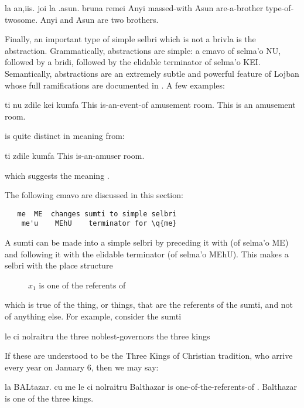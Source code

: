 \begin{example}
la an,iis. joi la .asun. bruna remei\n
Anyi massed-with Asun are-a-brother type-of-twosome.\n
Anyi and Asun are two brothers.
\end{example}

Finally, an important type of simple selbri which is not a
    brivla is the abstraction. Grammatically, abstractions are
    simple: a cmavo of selma'o NU, followed by a bridi, followed by
    the elidable terminator  of selma'o KEI. Semantically,
    abstractions are an extremely subtle and powerful feature of
    Lojban whose full ramifications are documented in . A few examples:
\begin{example}
ti nu zdile kei kumfa\n
This is-an-event-of amusement room.\n
This is an amusement room.
\end{example}

 is quite distinct in meaning
    from:
\begin{example}
ti zdile kumfa\n
This is-an-amuser room.
\end{example}

{\noindent}which suggests the meaning .



The following cmavo are discussed in this section:
\begin{verbatim}
   me  ME  changes sumti to simple selbri
    me'u    MEhU    terminator for \q{me}
\end{verbatim}
    A sumti can be made into a simple selbri by preceding it with
     (of selma'o ME) and following it with the elidable
    terminator  (of selma'o MEhU). This makes a selbri with
    the place structure 
\begin{description}
\item[] $x_1$ is one of the referents of 
\end{description}

which is true of the thing, or things, that are the referents
    of the sumti, and not of anything else. For example, consider
    the sumti
\begin{example}
le ci nolraitru\n
the three noblest-governors\n
the three kings
\end{example}

If these are understood to be the Three Kings of Christian
    tradition, who arrive every year on January 6, then we may say:
\begin{example}
la BALtazar. cu me le ci nolraitru\n
Balthazar is one-of-the-referents-of .\n
Balthazar is one of the three kings.
\end{example}

